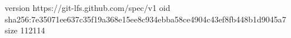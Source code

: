 version https://git-lfs.github.com/spec/v1
oid sha256:7e35071ee637c35f19a368e15ee8c934ebba58ce4904c43ef8fb448b1d9045a7
size 112114
